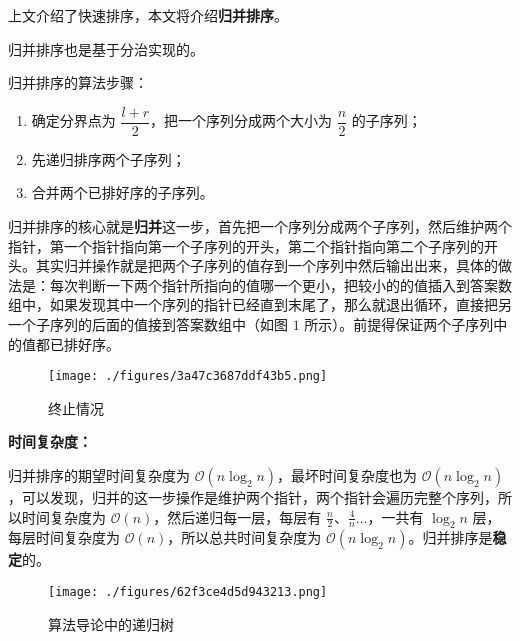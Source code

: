
上文介绍了快速排序，本文将介绍\textbf{归并排序}。

归并排序也是基于分治实现的。

归并排序的算法步骤：
\begin{enumerate}
\item 确定分界点为 $\dfrac{l + r}{2}$，把一个序列分成两个大小为 $\dfrac{n}{2}$ 的子序列；
\item 先递归排序两个子序列；
\item 合并两个已排好序的子序列。
\end{enumerate}

归并排序的核心就是\textbf{归并}这一步，首先把一个序列分成两个子序列，然后维护两个指针，第一个指针指向第一个子序列的开头，第二个指针指向第二个子序列的开头。其实归并操作就是把两个子序列的值存到一个序列中然后输出出来，具体的做法是：每次判断一下两个指针所指向的值哪一个更小，把较小的的值插入到答案数组中，如果发现其中一个序列的指针已经直到末尾了，那么就退出循环，直接把另一个子序列的后面的值接到答案数组中（如图 $1$ 所示）。前提得保证两个子序列中的值都已排好序。

\begin{figure}[ht]
\centering
\texttt{[image: ./figures/3a47c3687ddf43b5.png]}
\caption{终止情况} \label{fig_Msort_3}
\end{figure}

\textbf{时间复杂度：}

归并排序的期望时间复杂度为 $\mathcal{O}(n \log_2 n)$，最坏时间复杂度也为 $\mathcal{O}(n \log_2 n)$，可以发现，归并的这一步操作是维护两个指针，两个指针会遍历完整个序列，所以时间复杂度为 $\mathcal{O}(n)$，然后递归每一层，每层有 $\frac{n}{2}$、$\frac{4}{n}$...，一共有 $\log_2 n$ 层，每层时间复杂度为 $\mathcal{O}(n)$，所以总共时间复杂度为 $\mathcal{O}(n \log_2 n)$。归并排序是\textbf{稳定}的。

\begin{figure}[ht]
\centering
\texttt{[image: ./figures/62f3ce4d5d943213.png]}
\caption{算法导论中的递归树} \label{fig_Msort_1}
\end{figure}


